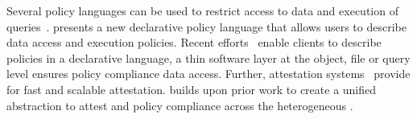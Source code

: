 Several policy languages can be used to restrict access to data and execution of queries~\cite{farnan-esorics-2011, PAQO-vldb-2013, mehta-security-2017, pesos-eurosys-2018, mehta-security-2017, beedkar-compl-geo-processing}.
\project{} presents a new declarative policy language that allows users to describe data access and execution policies. %
%
Recent efforts~\cite{pesos-eurosys-2018, guardat-eurosys-2015, elnikety-security-2016, mehta-security-2017, garg-ieeesp-2010, schengendb-kraska, datumdb-kraska, policy-offload-vldb, privacy-op-offload-systor} enable clients to describe policies in a declarative language, a thin software layer at the object, file or query level ensures policy compliance data access. Further, attestation systems~\cite{santos-security-2012, palaemon-dsn-2020} provide for fast and scalable attestation.
\project{} builds upon prior work to create a unified abstraction to attest and policy compliance across the heterogeneous \csd.

